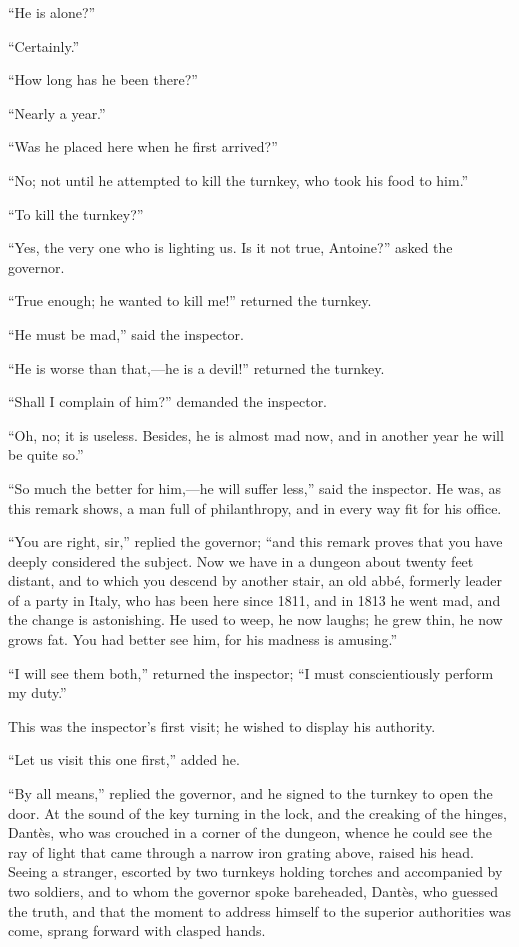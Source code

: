 “He is alone?”

“Certainly.”

“How long has he been there?”

“Nearly a year.”

“Was he placed here when he first arrived?”

“No; not until he attempted to kill the turnkey, who took his food to
him.”

“To kill the turnkey?”

“Yes, the very one who is lighting us. Is it not true, Antoine?” asked
the governor.

“True enough; he wanted to kill me!” returned the turnkey.

“He must be mad,” said the inspector.

“He is worse than that,—he is a devil!” returned the turnkey.

“Shall I complain of him?” demanded the inspector.

“Oh, no; it is useless. Besides, he is almost mad now, and in another
year he will be quite so.”

“So much the better for him,—he will suffer less,” said the inspector.
He was, as this remark shows, a man full of philanthropy, and in every
way fit for his office.

“You are right, sir,” replied the governor; “and this remark proves
that you have deeply considered the subject. Now we have in a dungeon
about twenty feet distant, and to which you descend by another stair,
an old abbé, formerly leader of a party in Italy, who has been here
since 1811, and in 1813 he went mad, and the change is astonishing. He
used to weep, he now laughs; he grew thin, he now grows fat. You had
better see him, for his madness is amusing.”

“I will see them both,” returned the inspector; “I must conscientiously
perform my duty.”

This was the inspector’s first visit; he wished to display his
authority.

“Let us visit this one first,” added he.

“By all means,” replied the governor, and he signed to the turnkey to
open the door. At the sound of the key turning in the lock, and the
creaking of the hinges, Dantès, who was crouched in a corner of the
dungeon, whence he could see the ray of light that came through a
narrow iron grating above, raised his head. Seeing a stranger, escorted
by two turnkeys holding torches and accompanied by two soldiers, and to
whom the governor spoke bareheaded, Dantès, who guessed the truth, and
that the moment to address himself to the superior authorities was
come, sprang forward with clasped hands.

